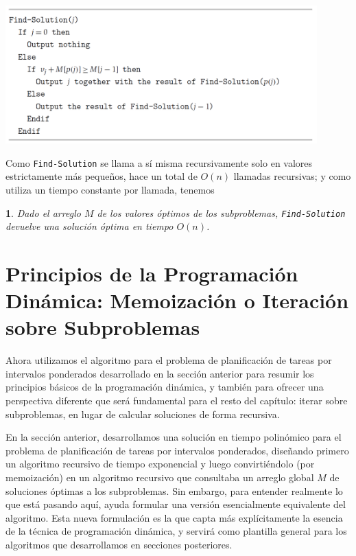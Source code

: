 \documentclass[a4paper, 12pt]{book}
\theoremstyle{dotless}
\newtheorem{theorem}{}[section]
\begin{document}
\includegraphics[width=0.9\textwidth]{Imagenes-Seccion6/cod6_3.PNG}

Como \texttt{Find-Solution} se llama a sí misma recursivamente solo en valores estrictamente más pequeños, hace un total de $O(n)$ llamadas recursivas; y como utiliza un tiempo constante por llamada, tenemos

\noindent\colorbox{mygray}{\parbox{\textwidth}{
\begin{theorem}
Dado el arreglo $M$ de los valores óptimos de los subproblemas, \texttt{Find-Solution} devuelve una solución óptima en tiempo $O(n)$.
\end{theorem}
}}


\section{Principios de la Programación Dinámica: Memoización o Iteración sobre Subproblemas}

Ahora utilizamos el algoritmo para el problema de planificación de tareas por intervalos ponderados
desarrollado en la sección anterior para resumir los principios básicos de la programación dinámica, y también para ofrecer una perspectiva diferente que será fundamental para el resto del capítulo: iterar sobre subproblemas, en lugar de calcular soluciones de forma recursiva.

En la sección anterior, desarrollamos una solución en tiempo polinómico para el problema de planificación de tareas por intervalos ponderados, diseñando primero un algoritmo recursivo de tiempo exponencial y luego convirtiéndolo (por memoización) en un algoritmo recursivo que consultaba un arreglo global $M$ de soluciones óptimas a los subproblemas. 
Sin embargo, para entender realmente lo que está pasando aquí, ayuda formular una versión esencialmente equivalente del algoritmo. 
Esta nueva formulación es la que capta más explícitamente la esencia de la técnica de programación dinámica, y servirá como plantilla general para los algoritmos que desarrollamos en secciones posteriores.
\end{document}
